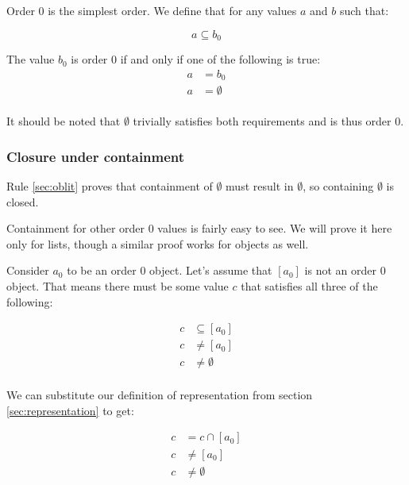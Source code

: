 \documentclass[letterpaper]{article}
\begin{document}
Order 0 is the simplest order. We define that for any values \(a\) and \(b\)
such that:

\begin{equation}
a \subseteq b_0
\end{equation}

The value \(b_0\) is order 0 if and only if one of the following is true:
\begin{equation}
\begin{split}
	a &= b_0 \\
	a &= \emptyset \\
\end{split}
\end{equation}

It should be noted that \(\emptyset\) trivially satisfies both requirements and
is thus order 0.

\subsubsection{Closure under containment}

Rule \ref{sec:oblit} proves that containment of \(\emptyset\) must result in
\(\emptyset\), so containing \(\emptyset\) is closed.

Containment for other order 0 values is fairly easy to see. We will prove it
here only for lists, though a similar proof works for objects as well.

Consider \(a_0\) to be an order 0 object. Let's assume that \([a_0]\) is
not an order 0 object. That means there must be some value \(c\) that satisfies
all three of the following:

\begin{equation}
\begin{split}
c &\subseteq [a_0] \\
c &\neq [a_0] \\
c &\neq \emptyset \\
\end{split}
\end{equation}

We can substitute our definition of representation from section
\ref{sec:representation} to get:

\begin{equation}
\begin{split}
c &= c \cap [a_0] \\
c &\neq [a_0] \\
c &\neq \emptyset \\
\end{split}
\end{equation}
\end{document}
